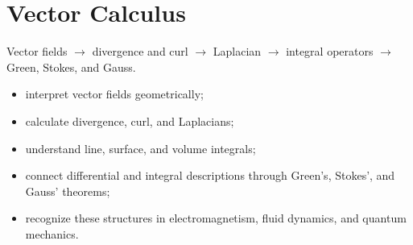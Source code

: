\chapter{Vector Calculus}
\begin{roadmapbox}
Vector fields $\longrightarrow$ divergence and curl $\longrightarrow$ Laplacian $\longrightarrow$ integral operators $\longrightarrow$ Green, Stokes, and Gauss.
\end{roadmapbox}
\learningobjectives
\begin{itemize}
\item interpret vector fields geometrically;
\item calculate divergence, curl, and Laplacians;
\item understand line, surface, and volume integrals;
\item connect differential and integral descriptions through Green's, Stokes', and Gauss' theorems;
\item recognize these structures in electromagnetism, fluid dynamics, and quantum mechanics.
\end{itemize}
\newpage











